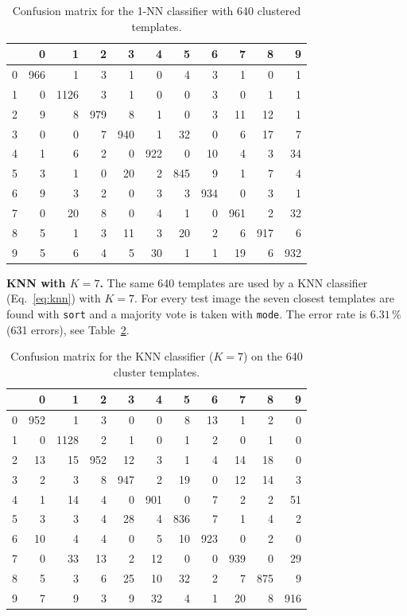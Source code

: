 \documentclass[11pt,a4paper]{article}
\begin{document}
\begin{table}[ht]
\centering
\caption{Confusion matrix for the 1-NN classifier with 640 clustered templates.}
\label{tab:mnist_task2_nn_conf}
\small
\begin{tabular}{c|rrrrrrrrrr}
\toprule
 & 0 & 1 & 2 & 3 & 4 & 5 & 6 & 7 & 8 & 9 \\
\midrule
0 & 966 & 1 & 3 & 1 & 0 & 4 & 3 & 1 & 0 & 1 \\
1 & 0 & 1126 & 3 & 1 & 0 & 0 & 3 & 0 & 1 & 1 \\
2 & 9 & 8 & 979 & 8 & 1 & 0 & 3 & 11 & 12 & 1 \\
3 & 0 & 0 & 7 & 940 & 1 & 32 & 0 & 6 & 17 & 7 \\
4 & 1 & 6 & 2 & 0 & 922 & 0 & 10 & 4 & 3 & 34 \\
5 & 3 & 1 & 0 & 20 & 2 & 845 & 9 & 1 & 7 & 4 \\
6 & 9 & 3 & 2 & 0 & 3 & 3 & 934 & 0 & 3 & 1 \\
7 & 0 & 20 & 8 & 0 & 4 & 1 & 0 & 961 & 2 & 32 \\
8 & 5 & 1 & 3 & 11 & 3 & 20 & 2 & 6 & 917 & 6 \\
9 & 5 & 6 & 4 & 5 & 30 & 1 & 1 & 19 & 6 & 932 \\
\bottomrule
\end{tabular}
\end{table}

\textbf{KNN with $K=7$.} The same 640 templates are used by a KNN classifier (Eq.~\eqref{eq:knn}) with $K=7$. For every test image the seven closest templates are found with \texttt{sort} and a majority vote is taken with \texttt{mode}. The error rate is $6.31\,\%$ (631 errors), see Table~\ref{tab:mnist_task2_knn_conf}.

\begin{table}[ht]
\centering
\caption{Confusion matrix for the KNN classifier ($K=7$) on the 640 cluster templates.}
\label{tab:mnist_task2_knn_conf}
\small
\begin{tabular}{c|rrrrrrrrrr}
\toprule
 & 0 & 1 & 2 & 3 & 4 & 5 & 6 & 7 & 8 & 9 \\
\midrule
0 & 952 & 1 & 3 & 0 & 0 & 8 & 13 & 1 & 2 & 0 \\
1 & 0 & 1128 & 2 & 1 & 0 & 1 & 2 & 0 & 1 & 0 \\
2 & 13 & 15 & 952 & 12 & 3 & 1 & 4 & 14 & 18 & 0 \\
3 & 2 & 3 & 8 & 947 & 2 & 19 & 0 & 12 & 14 & 3 \\
4 & 1 & 14 & 4 & 0 & 901 & 0 & 7 & 2 & 2 & 51 \\
5 & 3 & 3 & 4 & 28 & 4 & 836 & 7 & 1 & 4 & 2 \\
6 & 10 & 4 & 4 & 0 & 5 & 10 & 923 & 0 & 2 & 0 \\
7 & 0 & 33 & 13 & 2 & 12 & 0 & 0 & 939 & 0 & 29 \\
8 & 5 & 3 & 6 & 25 & 10 & 32 & 2 & 7 & 875 & 9 \\
9 & 7 & 9 & 3 & 9 & 32 & 4 & 1 & 20 & 8 & 916 \\
\bottomrule
\end{tabular}
\end{table}
\end{document}

